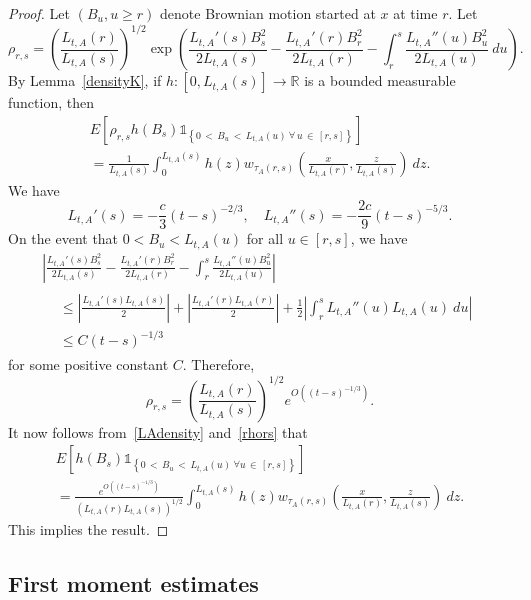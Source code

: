 \documentclass[10pt]{amsart}
\theoremstyle{definition}\newtheorem{defi}[theo]{Definition}\newtheorem{rema}[theo]{Remark}\newtheorem{exam}[theo]{Example}\newtheorem{exem}[theo]{Example}\newtheorem{nota}[theo]{Notation}
\newcommand*\R{\mathbb{R}}
\newcommand{\1} {\mathds{1}}
\let\oldforall\forall
\renewcommand*{\forall}{\mathrel{\oldforall}}
\begin{document}
\begin{proof}
Let $(B_u, u \geq r)$ denote Brownian motion started at $x$ at time $r$. Let
\[
\rho_{r,s} = \left(\frac{L_{t,A}(r)}{L_{t,A}(s)} \right)^{1/2} \exp \left(\frac{L_{t,A}'(s) B_s^2}{2L_{t,A}(s)} - \frac{L_{t,A}'(r)B_r^2}{2L_{t,A}(r)} - \int_r^s \frac{L_{t,A}''(u)B_u^2}{2L_{t,A}(u)} \: du \right).
\]
By Lemma~\ref{densityK}, if $h: [0, L_{t,A}(s)] \rightarrow \R$ is a bounded measurable function, then
\begin{multline}\label{LAdensity}
E \left[\rho_{r,s} h(B_s) \1_{\left\{0\,<\,B_u\,<\, L_{t,A}(u) \: \forall\,u\,\in\,[r, s]\right\}} \right]\\
= \frac{1}{L_{t,A}(s)} \int_0^{L_{t,A}(s)} h(z) w_{\tau_A(r,s)}\left(\frac{x}{L_{t,A}(r)}, \frac{z}{L_{t,A}(s)} \right) \: dz.
\end{multline}
We have
\[
L_{t,A}'(s) = -\frac{c}{3} (t - s)^{-2/3}, \quad L_{t,A}''(s) = -\frac{2c}{9} (t - s)^{-5/3}.
\]
On the event that $0 < B_u < L_{t,A}(u)$ for all $u \in [r, s]$, we have
\begin{multline*}
\left| \frac{L_{t,A}'(s) B_s^2}{2L_{t,A}(s)} - \frac{L_{t,A}'(r)B_r^2}{2L_{t,A}(r)} - \int_r^s \frac{L_{t,A}''(u) B_u^2}{2L_{t,A}(u)} \right| \\
\begin{aligned}
&\leq \left| \frac{L_{t,A}'(s) L_{t,A}(s)}{2} \right| + \left| \frac{L_{t,A}'(r) L_{t,A}(r)}{2} \right| + \frac{1}{2} \left| \int_r^s L_{t,A}''(u) L_{t,A}(u) \: du \right| \\
&\leq C (t - s)^{-1/3}
\end{aligned}
\end{multline*}
for some positive constant $C$. Therefore,
\begin{equation}\label{rhors}
\rho_{r,s} = \left(\frac{L_{t,A}(r)}{L_{t,A}(s)} \right)^{1/2}e^{O((t-s)^{-1/3})}.
\end{equation}
It now follows from~\eqref{LAdensity} and~\eqref{rhors} that
\begin{multline*}
E \left[h(B_s) \1_{\left\{0\,<\,B_u\,<\,L_{t,A}(u) \: \forall u\,\in\,[r,s]\right\}} \right]\\
= \frac{e^{O\left((t-s)^{-1/3}\right)}}{\left(L_{t,A}(r) L_{t,A}(s)\right)^{1/2}} \int_0^{L_{t,A}(s)} h(z) w_{\tau_A(r,s)} \left(\frac{x}{L_{t,A}(r)}, \frac{z}{L_{t,A}(s)} \right) \: dz.
\end{multline*}
This implies the result.
\end{proof}

\subsection{First moment estimates}\label{sec:first_moment_estimates}
\end{document}
